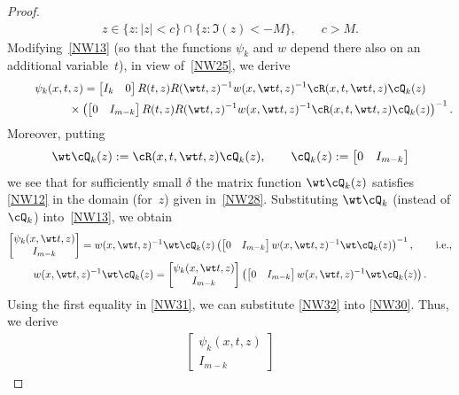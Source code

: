 \begin{proof}
\begin{gather}
 z \in \{z \colon |z|<c\}\cap \{z \colon \Im(z)<-M\}, \qquad\! c>M .
\end{gather}
Modifying~\eqref{NW13} (so that the functions $\psi_k$ and $w$ depend there also on an additional variable~$t$),
in view of~\eqref{NW25},
we derive
\begin{gather}\nonumber
  \psi_k (x,t,z)
= \begin{bmatrix}I_k &0 \end{bmatrix}
R(t,z)R(\wt t,z)^{-1}w(x,\wt t,z)^{-1}\cR(x,t, \wt t,z)
 \cQ_k (z)
\\
\hphantom{\psi_k (x,t,z)=}{} \times \left(
  \begin{bmatrix}0 &I_{m-k} \end{bmatrix}
 R(t,z)R(\wt t,z)^{-1}w(x,\wt t,z)^{-1}\cR(x,t, \wt t,z)
  \cQ_k(z)
 \right)^{-1}.
 \label{NW30}
\end{gather}
Moreover, putting
\begin{gather} \label{NW31}
\wt \cQ_k(z):=\cR(x,t, \wt t,z)\cQ_k(z), \qquad \cQ_k(z):=\begin{bmatrix} 0 & I_{m-k}\end{bmatrix}
\end{gather}
we see that for suf\/f\/iciently small $\delta$ the matrix function $\wt \cQ_k(z)$ satisf\/ies \eqref{NW12} in the domain (for~$z$)
given in~\eqref{NW28}. Substituting $\wt \cQ_k$ (instead of $ \cQ_k$) into~\eqref{NW13}, we obtain
\begin{gather} \nonumber
\begin{bmatrix}\psi_k(x, \wt t,z) \\ I_{m-k} \end{bmatrix}=w(x,\wt t,z)^{-1}\wt \cQ_k(z)\left(
  \begin{bmatrix}0 &I_{m-k} \end{bmatrix}
 w(x,\wt t,z)^{-1}
  \wt \cQ_k(z)
 \right)^{-1}, \qquad {\mathrm{i.e.,}}
\\ \label{NW32}
w(x,\wt t,z)^{-1}\wt \cQ_k(z)=\begin{bmatrix}\psi_k(x, \wt t,z) \\ I_{m-k} \end{bmatrix}\left(
  \begin{bmatrix}0 &I_{m-k} \end{bmatrix}
 w(x,\wt t,z)^{-1}
  \wt \cQ_k(z)
 \right).
\end{gather}
Using the f\/irst equality in \eqref{NW31}, we can substitute \eqref{NW32} into \eqref{NW30}.
Thus, we derive
\begin{gather*}
\begin{bmatrix} \psi_k(x, t,z) \\ I_{m-k} \end{bmatrix}

\end{gather*}
\end{proof}
